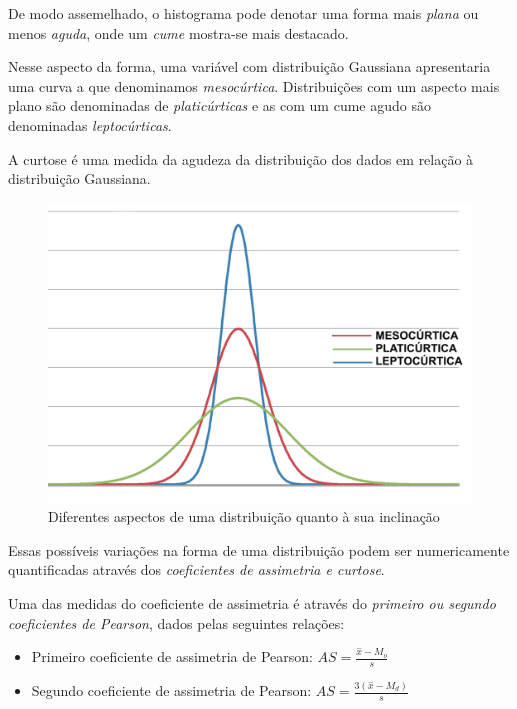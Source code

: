 \documentclass[
]{book}
\providecommand{\tightlist}{%
  \setlength{\itemsep}{0pt}\setlength{\parskip}{0pt}}
\begin{document}
\hfill\break

De modo assemelhado, o histograma pode denotar uma forma mais \emph{plana} ou menos \emph{aguda}, onde um \emph{cume} mostra-se mais destacado.

\hfill\break

Nesse aspecto da forma, uma variável com distribuição Gaussiana apresentaria uma curva a que denominamos \emph{mesocúrtica}. Distribuições com um aspecto mais plano são denominadas de \emph{platicúrticas} e as com um cume agudo são denominadas \emph{leptocúrticas}.

\hfill\break

A curtose é uma medida da agudeza da distribuição dos dados em relação à distribuição Gaussiana.

\hfill\break

\begin{figure}

{\centering \includegraphics[width=0.8\linewidth]{images3/curtose} 

}

\caption{Diferentes aspectos de uma distribuição quanto à sua inclinação}\label{fig:unnamed-chunk-37}
\end{figure}

\hfill\break

Essas possíveis variações na forma de uma distribuição podem ser numericamente quantificadas através dos \emph{coeficientes de assimetria e curtose}.

\hfill\break

Uma das medidas do coeficiente de assimetria é através do \emph{primeiro ou segundo coeficientes de Pearson}, dados pelas seguintes relações:

\hfill\break

\begin{itemize}
\tightlist
\item
  Primeiro coeficiente de assimetria de Pearson: \(AS= \frac{ \stackrel{-}{x} - M_{o} }{ s }\)
\item
  Segundo coeficiente de assimetria de Pearson: \(AS = \frac{ 3 ( \stackrel{-}{x} - M_{d}) } { s }\)
\end{itemize}
\end{document}
